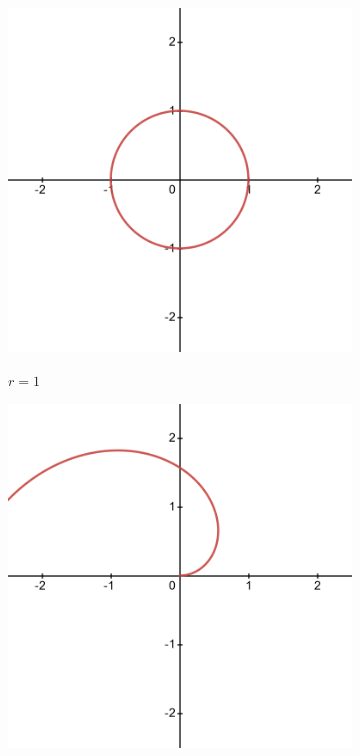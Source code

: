 \documentclass[11pt]{article}
\begin{document}
\begin{flushleft}
\begin{figure}[h]
	\begin{subfigure}[b]{0.3\textwidth}
	\centering
	\includegraphics[width=\textwidth]{requals1.png}
	\label{fig:i}
	\caption{$r=1$}
	\end{subfigure}
	\hfill
	\begin{subfigure}[b]{0.3\textwidth}
	\centering
	\includegraphics[width=\textwidth]{requalstheta.png}

\end{subfigure}
\end{figure}
\end{flushleft}
\end{document}
